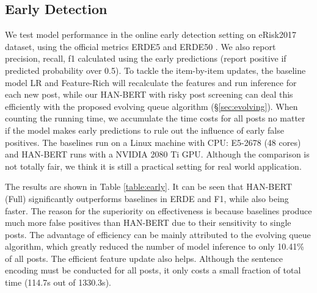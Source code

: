 \subsection{Early Detection}

We test model performance in the online early detection setting on eRisk2017 dataset, using the official metrics ERDE5 and ERDE50 \citep{losada2017erisk}. We also report precision, recall, f1 calculated using the early predictions (report positive if predicted probability over 0.5). To tackle the item-by-item updates, the baseline model LR and Feature-Rich will recalculate the features and run inference for each new post, while our HAN-BERT with risky post screening can deal this efficiently with the proposed evolving queue algorithm (\S \ref{sec:evolving}). When counting the running time, we accumulate the time costs for all posts no matter if the model makes early predictions to rule out the influence of early false positives. The baselines run on a Linux machine with CPU: E5-2678 (48 cores) and HAN-BERT runs with a NVIDIA 2080 Ti GPU. Although the comparison is not totally fair, we think it is still a practical setting for real world application.

The results are shown in Table \ref{table:early}. It can be seen that HAN-BERT (Full) significantly outperforms baselines in ERDE and F1, while also being faster. The reason for the superiority on effectiveness is because baselines produce much more false positives than HAN-BERT due to their sensitivity to single posts. The advantage of efficiency can be mainly attributed to the evolving queue algorithm, which greatly reduced the number of model inference to only 10.41\% of all posts. The efficient feature update also helps. Although the sentence encoding must be conducted for all posts, it only costs a small fraction of total time (114.7s out of 1330.3s). 

